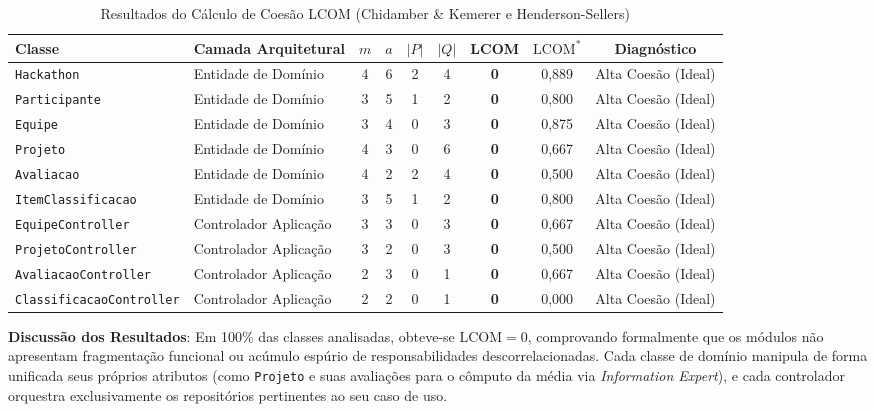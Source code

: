 \documentclass[12pt]{article}
\begin{document}
\begin{table}[H]
\centering
\scriptsize
\setlength{\tabcolsep}{3.5pt}
\begin{tabular}{|l|l|c|c|c|c|c|c|c|}
\hline
\textbf{Classe} & \textbf{Camada Arquitetural} & $m$ & $a$ & $|P|$ & $|Q|$ & \textbf{LCOM} & $\text{LCOM}^*$ & \textbf{Diagnóstico} \\ \hline
\texttt{Hackathon} & Entidade de Domínio & 4 & 6 & 2 & 4 & \textbf{0} & 0,889 & Alta Coesão (Ideal) \\ \hline
\texttt{Participante} & Entidade de Domínio & 3 & 5 & 1 & 2 & \textbf{0} & 0,800 & Alta Coesão (Ideal) \\ \hline
\texttt{Equipe} & Entidade de Domínio & 3 & 4 & 0 & 3 & \textbf{0} & 0,875 & Alta Coesão (Ideal) \\ \hline
\texttt{Projeto} & Entidade de Domínio & 4 & 3 & 0 & 6 & \textbf{0} & 0,667 & Alta Coesão (Ideal) \\ \hline
\texttt{Avaliacao} & Entidade de Domínio & 4 & 2 & 2 & 4 & \textbf{0} & 0,500 & Alta Coesão (Ideal) \\ \hline
\texttt{ItemClassificacao} & Entidade de Domínio & 3 & 5 & 1 & 2 & \textbf{0} & 0,800 & Alta Coesão (Ideal) \\ \hline
\texttt{EquipeController} & Controlador Aplicação & 3 & 3 & 0 & 3 & \textbf{0} & 0,667 & Alta Coesão (Ideal) \\ \hline
\texttt{ProjetoController} & Controlador Aplicação & 3 & 2 & 0 & 3 & \textbf{0} & 0,500 & Alta Coesão (Ideal) \\ \hline
\texttt{AvaliacaoController} & Controlador Aplicação & 2 & 3 & 0 & 1 & \textbf{0} & 0,667 & Alta Coesão (Ideal) \\ \hline
\texttt{ClassificacaoController} & Controlador Aplicação & 2 & 2 & 0 & 1 & \textbf{0} & 0,000 & Alta Coesão (Ideal) \\ \hline
\end{tabular}
\caption{Resultados do Cálculo de Coesão LCOM (Chidamber \& Kemerer e Henderson-Sellers)}
\label{tab:lcom}
\end{table}

\textbf{Discussão dos Resultados}: Em 100\% das classes analisadas, obteve-se $\text{LCOM} = 0$, comprovando formalmente que os módulos não apresentam fragmentação funcional ou acúmulo espúrio de responsabilidades descorrelacionadas. Cada classe de domínio manipula de forma unificada seus próprios atributos (como \texttt{Projeto} e suas avaliações para o cômputo da média via \textit{Information Expert}), e cada controlador orquestra exclusivamente os repositórios pertinentes ao seu caso de uso.
\end{document}
